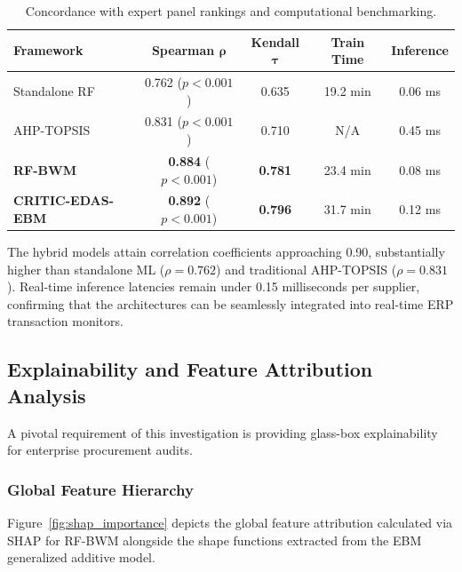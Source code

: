 \documentclass[twocolumn,10pt]{article}
\begin{document}
\begin{table}[h]
\centering
\caption{Concordance with expert panel rankings and computational benchmarking.}
\label{tab:ranking_metrics}
\footnotesize
\begin{tabular}{lcccc}
\toprule
\textbf{Framework} & \textbf{Spearman $\boldsymbol{\rho}$} & \textbf{Kendall $\boldsymbol{\tau}$} & \textbf{Train Time} & \textbf{Inference} \\
\midrule
Standalone RF & 0.762 ($p < 0.001$) & 0.635 & 19.2 min & 0.06 ms \\
AHP-TOPSIS & 0.831 ($p < 0.001$) & 0.710 & N/A & 0.45 ms \\
\textbf{RF-BWM} & \textbf{0.884} ($p < 0.001$) & \textbf{0.781} & 23.4 min & 0.08 ms \\
\textbf{CRITIC-EDAS-EBM} & \textbf{0.892} ($p < 0.001$) & \textbf{0.796} & 31.7 min & 0.12 ms \\
\bottomrule
\end{tabular}
\end{table}

The hybrid models attain correlation coefficients approaching 0.90, substantially higher than standalone ML ($\rho = 0.762$) and traditional AHP-TOPSIS ($\rho = 0.831$). Real-time inference latencies remain under 0.15 milliseconds per supplier, confirming that the architectures can be seamlessly integrated into real-time ERP transaction monitors.

\subsection{Explainability and Feature Attribution Analysis}
A pivotal requirement of this investigation is providing glass-box explainability for enterprise procurement audits. 

\subsubsection{Global Feature Hierarchy}
Figure~\ref{fig:shap_importance} depicts the global feature attribution calculated via SHAP for RF-BWM alongside the shape functions extracted from the EBM generalized additive model.
\end{document}
